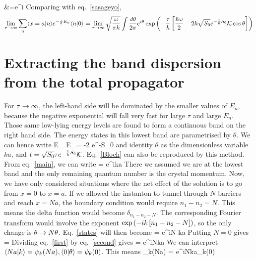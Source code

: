 \documentclass[12pt,onecolumn]{revtex4-2}
\begin{document}
					  &=\sqrt{\fr{ \omega  }{\pi \hbar }}\int {}e^{i\theta} 
\eeq
Comparing with eq.~\ref{sasageyo},
\begin{equation}\begin{aligned}
\label{main}
\lim_{\tau \to \infty}\sum_n \langle{x=a|n}\rangle e^{-\frac{\tau}{\hbar}E_n} \langle{n|0}\rangle = \lim_{\tau \to \infty}\sqrt{\frac{ \omega  }{\pi \hbar }}\int \frac{d\theta}{2\pi}e^{i\theta} \exp\left({-\frac{\tau}{\hbar}\left[{\frac{\hbar\omega}{2}-2\hbar\sqrt{S_0} e^{-\frac{1}{\hbar}S_0}\mathcal{K}\cos\theta}\right]}\right)\\
\end{aligned}\end{equation}
\section{Extracting the band dispersion from the total propagator}
For \(\tau \rightarrow \infty\), the left-hand side will be dominated by the smaller values of \(E_n\), because the negative exponential will fall very fast for large \(\tau\) and large \(E_n\). Those same low-lying energy levels are found to form a continuous band on the right hand side. The energy states in this lowest band are parametrised by \(\theta\). We can hence write
\beq
E_ \approx E_\theta = -2\hbar{} e^{-S_0}\cos\theta
\eeq
and identity \(\theta\) as the dimensionless variable \(ka\), and \(t = \sqrt{S_0} \tau e^{-\frac{1}{\hbar}S_0}\mathcal{K}\). Eq.~\ref{Bloch}  can also be reproduced by this method. From eq.~\ref{main}, we can write
\beq[states]
 = \sqrt{\fr{ \omega  }{\pi \hbar }}e^{ika}
\eeq
There we assumed we are at the lowest band and the only remaining quantum number is the crystal momentum. Now, we have only considered situations where the net effect of the solution is to go from \(x=0\) to \(x=a\). If we allowed the instanton to tunnel through \(N\) barriers and reach \(x=Na\), the boundary condition would require \(n_1 - n_2 = N\). This means the delta function would become \(\delta_{n_1 - n_2 - N}\). The corresponding Fourier transform would involve the exponent \(\exp\left({-ik\left[{n_1 - n_2 - N}\right]}\right)\), so the only change is  \(\theta \rightarrow N\theta\). Eq.~\ref{states} will then become
\beq[first]
 = \sqrt{\fr{ \omega  }{\pi \hbar }}e^{iN ka}
\eeq
Putting \(N=0\) gives
\beq[second]
 = \sqrt{\fr{ \omega  }{\pi \hbar }}
\eeq
Dividing eq.~\ref{first} by eq.~\ref{second} gives
\beq
{}= e^{iNka}
\eeq
We can interpret \(\langle{Na|k}\rangle = \psi_k(Na), \langle{0|\theta}\rangle = \psi_\theta(0)\). This means
\beq[guren]
\psi_k(Na) = e^{iNka}\psi_k(0)
\eeq
\end{document}
